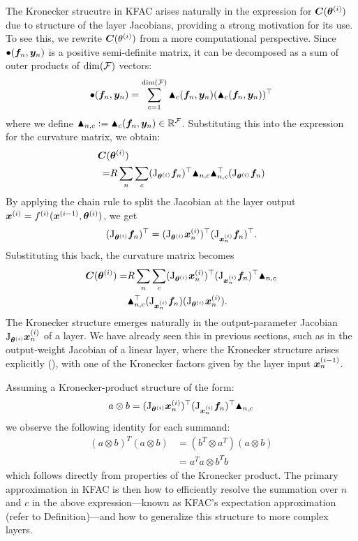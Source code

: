The Kronecker strucutre in KFAC arises naturally in the expression for ${\bm{C}}({\bm{\theta}}^{(i)})$ due to structure of the layer Jacobians, providing a strong motivation for its use. 
To see this, we rewrite ${\bm{C}}(\theta^{(i)})$ from a more computational perspective. 
Since $\bullet({\bm{f}}_n, {\bm{y}}_n)$ is a positive semi-definite matrix, it can be decomposed as a sum of outer products of $\dim({\mathcal{F}})$ vectors: $$\bullet({\bm{f}}_n, {\bm{y}}_n) = \sum_{c=1}^{\dim({\mathcal{F}})} \blacktriangle_c({\bm{f}}_n, {\bm{y}}_n) (\blacktriangle_c({\bm{f}}_n, {\bm{y}}_n))^{\top}$$ 
where we define $\blacktriangle_{n,c} := \blacktriangle_c({\bm{f}}_n, {\bm{y}}_n) \in {\mathbb{R}}^{{\mathcal{F}}}$. 
Substituting this into the expression for the curvature matrix, we obtain:
\begin{align*}
  {\bm{C}}(&{\bm{\theta}}^{(i)}) \\
  =& 
  R \sum_n \sum_{c}
  (\mathrm{J}_{{\bm{\theta}}^{(i)}} {\bm{f}}_n)^{\top}
  \blacktriangle_{n,c} \blacktriangle_{n,c}^{\top}
  (\mathrm{J}_{{\bm{\theta}}^{(i)}} {\bm{f}}_n)
\end{align*}
By applying the chain rule to split the Jacobian at the layer output ${\bm{x}}^{(i)} = f^{(i)}({\bm{x}}^{(i-1)}, {\bm{\theta}}^{(i)})$, we get
\begin{align*}
  (\mathrm{J}_{{\bm{\theta}}^{(i)}} {\bm{f}}_n)^{\top}
  =
  (\mathrm{J}_{{\bm{\theta}}^{(i)}} {\bm{x}}^{(i)}_n)^{\top}
  (\mathrm{J}_{{\bm{x}}_n^{(i)}} {\bm{f}}_n)^{\top}.
\end{align*}
Substituting this back, the curvature matrix becomes
\begin{align*}
  {\bm{C}}({\bm{\theta}}^{(i)}) =& R \sum_n \sum_{c}
  (\mathrm{J}_{{\bm{\theta}}^{(i)}} {\bm{x}}^{(i)}_n)^{\top}
  (\mathrm{J}_{{\bm{x}}_n^{(i)}} {\bm{f}}_n)^{\top}
  \blacktriangle_{n,c} \\
  &\blacktriangle_{n,c}^{\top}
  (\mathrm{J}_{{\bm{x}}_n^{(i)}} {\bm{f}}_n)
  (\mathrm{J}_{{\bm{\theta}}^{(i)}} {\bm{x}}^{(i)}_n).
\end{align*}
The Kronecker structure emerges naturally in the output-parameter Jacobian $\mathrm{J}_{{\bm{\theta}}^{(i)}} {\bm{x}}_n^{(i)}$ of a layer. 
We have already seen this in previous sections, such as in the output-weight Jacobian of a linear layer, where the Kronecker structure arises explicitly (), with one of the Kronecker factors given by the layer input ${\bm{x}}^{(i-1)}_n$. 

Assuming a Kronecker-product structure of the form:
$$ a \otimes b = (\mathrm{J}_{{\bm{\theta}}^{(i)}} {\bm{x}}^{(i)}_n)^{\top}
(\mathrm{J}_{{\bm{x}}_n^{(i)}} {\bm{f}}_n)^{\top}
\blacktriangle_{n,c} $$ 
we observe the following identity for each summand:
\begin{align*}
(a \otimes b)^T (a \otimes b) &= (b^T \otimes a^T)(a \otimes b) \\
&= a^Ta \otimes b^Tb
\end{align*}
which follows directly from properties of the Kronecker product. 
The primary approximation in KFAC is then how to efficiently resolve the summation over $n$ and $c$ in the above expression---known as KFAC's expectation approximation (refer to Definition)---and how to generalize this structure to more complex layers.

